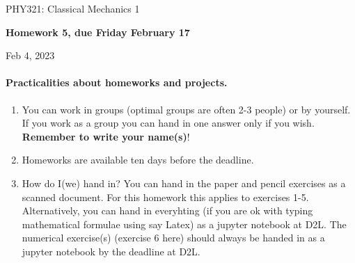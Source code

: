 \documentclass[%
oneside,                 %
final,                   %
10pt]{article}
\begin{document}

\newcommand{\exercisesection}[1]{\subsection*{#1}}






\thispagestyle{empty}

\begin{center}
{\LARGE\bf
\begin{spacing}{1.25}
PHY321: Classical Mechanics 1
\end{spacing}
}
\end{center}


\begin{center}
{\bf Homework 5, due Friday   February 17${}^{}$} \\ [0mm]
\end{center}

\begin{center}
\end{center}
    

\begin{center}
Feb 4, 2023
\end{center}

\vspace{1cm}


\paragraph{Practicalities about  homeworks and projects.}
\begin{enumerate}
\item You can work in groups (optimal groups are often 2-3 people) or by yourself. If you work as a group you can hand in one answer only if you wish. \textbf{Remember to write your name(s)}!

\item Homeworks are available ten days before the deadline.

\item How do I(we)  hand in?  You can hand in the paper and pencil exercises as a scanned document. For this homework this applies to exercises 1-5. Alternatively, you can hand in everyhting (if you are ok with typing mathematical formulae using say Latex) as a jupyter notebook at D2L. The numerical exercise(s) (exercise 6 here) should always be handed in as a jupyter notebook by the deadline at D2L. 
\end{enumerate}
\end{document}
